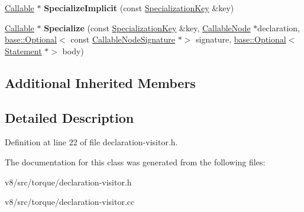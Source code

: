 \begin{DoxyCompactItemize}
\mbox{\hyperlink{classv8_1_1internal_1_1torque_1_1Callable}{Callable}} $\ast$ {\bfseries Specialize\+Implicit} (const \mbox{\hyperlink{structv8_1_1internal_1_1torque_1_1SpecializationKey}{Specialization\+Key}} \&key)
\item 
\mbox{\label{classv8_1_1internal_1_1torque_1_1DeclarationVisitor_a2fb6fcf99ae756b6e9961cffce952db5}} 
\mbox{\hyperlink{classv8_1_1internal_1_1torque_1_1Callable}{Callable}} $\ast$ {\bfseries Specialize} (const \mbox{\hyperlink{structv8_1_1internal_1_1torque_1_1SpecializationKey}{Specialization\+Key}} \&key, \mbox{\hyperlink{structv8_1_1internal_1_1torque_1_1CallableNode}{Callable\+Node}} $\ast$declaration, \mbox{\hyperlink{classv8_1_1base_1_1Optional}{base\+::\+Optional}}$<$ const \mbox{\hyperlink{structv8_1_1internal_1_1torque_1_1CallableNodeSignature}{Callable\+Node\+Signature}} $\ast$$>$ signature, \mbox{\hyperlink{classv8_1_1base_1_1Optional}{base\+::\+Optional}}$<$ \mbox{\hyperlink{structv8_1_1internal_1_1torque_1_1Statement}{Statement}} $\ast$$>$ body)
\end{DoxyCompactItemize}
\subsection*{Additional Inherited Members}


\subsection{Detailed Description}


Definition at line 22 of file declaration-\/visitor.\+h.



The documentation for this class was generated from the following files\+:\begin{DoxyCompactItemize}
\item 
v8/src/torque/declaration-\/visitor.\+h\item 
v8/src/torque/declaration-\/visitor.\+cc\end{DoxyCompactItemize}
